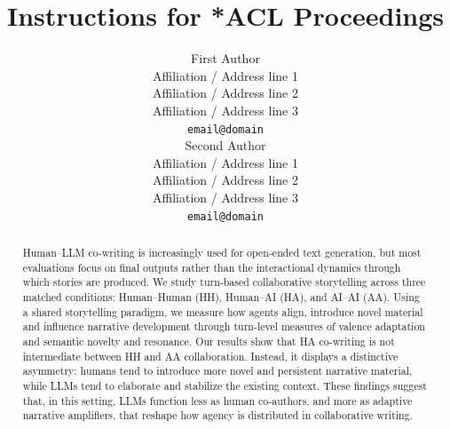 \documentclass[11pt]{article}
\title{Instructions for *ACL Proceedings}
\author{First Author \\
  Affiliation / Address line 1 \\
  Affiliation / Address line 2 \\
  Affiliation / Address line 3 \\
  \texttt{email@domain} \\\And
  Second Author \\
  Affiliation / Address line 1 \\
  Affiliation / Address line 2 \\
  Affiliation / Address line 3 \\
  \texttt{email@domain} \\}
\begin{document}
\maketitle

\begin{abstract}
Human--LLM co-writing is increasingly used for open-ended text generation, but most evaluations focus on final outputs rather than the interactional dynamics through which stories are produced. We study turn-based collaborative storytelling across three matched conditions: Human--Human (HH), Human--AI (HA), and AI--AI (AA). Using a shared storytelling paradigm, we measure how agents align, introduce novel material and influence narrative development through turn-level measures of valence adaptation and semantic novelty and resonance. Our results show that HA co-writing is not intermediate between HH and AA collaboration. Instead, it displays a distinctive asymmetry: humans tend to introduce more novel and persistent narrative material, while LLMs tend to elaborate and stabilize the existing context. These findings suggest that, in this setting, LLMs function less as human co-authors, and more as adaptive narrative amplifiers, that reshape how agency is distributed in collaborative writing.
\end{abstract}
\end{document}
